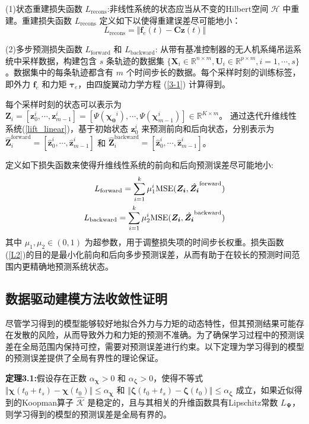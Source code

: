 \documentclass[lang=chs, degree=master, blindreview=false, winfonts=true]{yanputhesis}
\begin{document}
(1)状态重建损失函数 $L_{\text{recons}}$:非线性系统的状态应当从不变的Hilbert空间 $\mathcal{H}$ 中重建。重建损失函数 $L_{\text{recons}}$ 定义如下以使得重建误差尽可能地小：
\begin{equation}
	L_{\text{recons}}=\Vert \bm{f}_e(t) - \bm{C} \bm{z}(t) \Vert
\end{equation}

(2)多步预测损失函数 $L_{\text{forward}}$ 和 $L_{\text{backward}}$: 从带有基准控制器的无人机系绳吊运系统中采样数据，构建包含 $s$ 条轨迹的数据集 $\{\bm{X}_i \in \mathbb{R}^{n\times m}, \bm{U}_i \in \mathbb{R}^{p \times m}, i=1,\cdots,s\}$。数据集中的每条轨迹都含有 $m$ 个时间步长的数据。每个采样时刻的训练标签，即外力 $\bm{f}_e$ 和力矩 $\bm{\tau}_e$，由四旋翼动力学方程 (\ref{3-1}) 计算得到。

每个采样时刻的状态可以表示为 $\bm{Z}_i = [\bm{z}_0^i,\cdots,\bm{z}_{m-1}^i]=[{\Psi}(\bm{\chi_{0}}^i),\cdots,{\Psi}(\bm{\chi}_{m-1}^i)]\in \mathbb{R}^{K\times m}$。
通过迭代升维线性系统(\ref{lift_linear})，基于初始状态 $\bm{z}_0^i$ 来预测前向和后向状态，分别表示为$\hat{\bm{Z}}_i^{\text{forward}} = [\hat{\bm{z}}_0^i, \cdots, \hat{\bm{z}}_{m-1}^i]$ 和 $\hat{\bm{Z}}_i^{\text{backward}} = [\hat{\bm{z}}_0^i, \cdots, \hat{\bm{z}}_{m-1}^i]$。

定义如下损失函数来使得升维线性系统的前向和后向预测误差尽可能地小:
\begin{equation}
	\begin{aligned}
		L_{\text{forward}} = \sum_{i=1}^{k} \mu_1^{i} {\rm MSE}(\bm{Z_{i}},\hat{\bm{Z_{i}}}^{\text{forward}})  \\
		L_{\text{backward}} = \sum_{i=1}^{k} \mu_2^{i} {\rm MSE}(\bm{Z_{i}},\hat{\bm{Z_{i}}}^{\text{backward}})\label{L2}
	\end{aligned}
\end{equation}
其中 $\mu_1,\mu_2 \in(\text{0},\text{1})$ 为超参数，用于调整损失项的时间步长权重。损失函数(\ref{L2})的目的是最小化前向和后向多步预测误差，从而有助于在较长的预测时间范围内更精确地预测系统状态。

\subsection{数据驱动建模方法收敛性证明}
尽管学习得到的模型能够较好地拟合外力与力矩的动态特性，但其预测结果可能存在发散的风险，从而导致外力和力矩的预测不准确。为了确保学习过程中的预测误差在全局范围内保持可控，需要对预测误差进行约束。以下定理为学习得到的模型的预测误差提供了全局有界性的理论保证。

\textbf{定理3.1:}假设存在正数 $\alpha_{\bm{\chi}}>0$ 和 $\alpha_{\bm{\zeta}}>0$，使得不等式 $\Vert \bm{\chi}(t_0+t_s)-\bm{\chi}(t_0)\Vert \le \alpha_{\bm{\chi}}$ 和 $\Vert \bm{\zeta}(t_0+t_s) - \bm{\zeta}(t_0) \Vert \le \alpha_{\bm{\zeta}}$ 成立，如果近似得到的Koopman算子 $\hat{{\mathcal{K}}}$ 是稳定的，且与其相关的升维函数具有Lipschitz常数 $L_{\bm{\Psi}}$，则学习得到的模型的预测误差是全局有界的。
\end{document}
